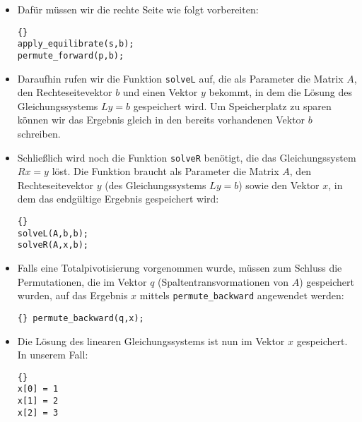 \documentclass[a4paper,11pt]{article}
\theoremstyle{definition}
\begin{document}
\begin{itemize}
\item Dafür müssen wir die rechte Seite wie folgt vorbereiten:

{\footnotesize{\begin{lstlisting}{}
apply_equilibrate(s,b);
permute_forward(p,b);
\end{lstlisting}}}

\item Daraufhin rufen wir die Funktion \lstinline{solveL} auf, die als
  Parameter die Matrix $A$, den Rechteseitevektor $b$ und einen Vektor
  $y$ bekommt, in dem die Lösung des Gleichungssystems $Ly=b$
  gespeichert wird. Um Speicherplatz zu sparen können wir das Ergebnis
  gleich in den bereits vorhandenen Vektor $b$ schreiben.

\item Schließlich wird noch die Funktion \lstinline{solveR} benötigt,
  die das Gleichungssystem $Rx=y$ löst. Die Funktion braucht als
  Parameter die Matrix $A$, den Rechteseitevektor $y$ (des
  Gleichungssystems $Ly=b$) sowie den Vektor $x$, in dem das
  endgültige Ergebnis gespeichert wird:

  {\footnotesize{\begin{lstlisting}{}
solveL(A,b,b);
solveR(A,x,b);
\end{lstlisting}}}

\item Falls eine Totalpivotisierung vorgenommen wurde, müssen zum
  Schluss die Permutationen, die im Vektor $q$
  (Spaltentransvormationen von $A$) gespeichert wurden, auf das
  Ergebnis $x$ mittels \lstinline{permute_backward} angewendet werden:
  {\footnotesize{\begin{lstlisting}{} permute_backward(q,x);
\end{lstlisting}}}

\item Die Lösung des linearen Gleichungssystems ist nun im Vektor $x$
  gespeichert. In unserem Fall:

    {\footnotesize{\begin{lstlisting}{}
x[0] = 1
x[1] = 2
x[2] = 3
\end{lstlisting}}}
  \end{itemize}
\end{document}

